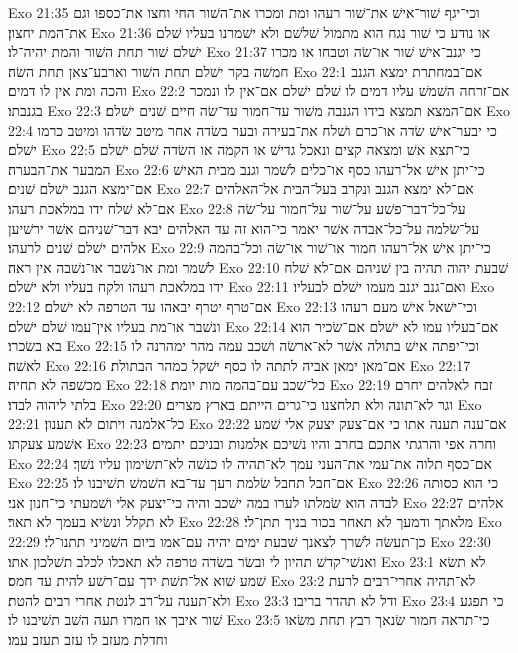 Exo 21:35  וכי־יגף שׁור־אישׁ את־שׁור רעהו ומת ומכרו את־השׁור החי וחצו את־כספו וגם את־המת יחצון׃
Exo 21:36  או נודע כי שׁור נגח הוא מתמול שׁלשׁם ולא ישׁמרנו בעליו שׁלם ישׁלם שׁור תחת השׁור והמת יהיה־לו׃
Exo 21:37  כי יגנב־אישׁ שׁור או־שׂה וטבחו או מכרו חמשׁה בקר ישׁלם תחת השׁור וארבע־צאן תחת השׂה׃
Exo 22:1  אם־במחתרת ימצא הגנב והכה ומת אין לו דמים׃
Exo 22:2  אם־זרחה השׁמשׁ עליו דמים לו שׁלם ישׁלם אם־אין לו ונמכר בגנבתו׃
Exo 22:3  אם־המצא תמצא בידו הגנבה משׁור עד־חמור עד־שׂה חיים שׁנים ישׁלם׃
Exo 22:4  כי יבער־אישׁ שׂדה או־כרם ושׁלח את־בעירה ובער בשׂדה אחר מיטב שׂדהו ומיטב כרמו ישׁלם׃
Exo 22:5  כי־תצא אשׁ ומצאה קצים ונאכל גדישׁ או הקמה או השׂדה שׁלם ישׁלם המבער את־הבערה׃
Exo 22:6  כי־יתן אישׁ אל־רעהו כסף או־כלים לשׁמר וגנב מבית האישׁ אם־ימצא הגנב ישׁלם שׁנים׃
Exo 22:7  אם־לא ימצא הגנב ונקרב בעל־הבית אל־האלהים אם־לא שׁלח ידו במלאכת רעהו׃
Exo 22:8  על־כל־דבר־פשׁע על־שׁור על־חמור על־שׂה על־שׂלמה על־כל־אבדה אשׁר יאמר כי־הוא זה עד האלהים יבא דבר־שׁניהם אשׁר ירשׁיען אלהים ישׁלם שׁנים לרעהו׃
Exo 22:9  כי־יתן אישׁ אל־רעהו חמור או־שׁור או־שׂה וכל־בהמה לשׁמר ומת או־נשׁבר או־נשׁבה אין ראה׃
Exo 22:10  שׁבעת יהוה תהיה בין שׁניהם אם־לא שׁלח ידו במלאכת רעהו ולקח בעליו ולא ישׁלם׃
Exo 22:11  ואם־גנב יגנב מעמו ישׁלם לבעליו׃
Exo 22:12  אם־טרף יטרף יבאהו עד הטרפה לא ישׁלם׃
Exo 22:13  וכי־ישׁאל אישׁ מעם רעהו ונשׁבר או־מת בעליו אין־עמו שׁלם ישׁלם׃
Exo 22:14  אם־בעליו עמו לא ישׁלם אם־שׂכיר הוא בא בשׂכרו׃
Exo 22:15  וכי־יפתה אישׁ בתולה אשׁר לא־ארשׂה ושׁכב עמה מהר ימהרנה לו לאשׁה׃
Exo 22:16  אם־מאן ימאן אביה לתתה לו כסף ישׁקל כמהר הבתולת׃
Exo 22:17  מכשׁפה לא תחיה׃
Exo 22:18  כל־שׁכב עם־בהמה מות יומת׃
Exo 22:19  זבח לאלהים יחרם בלתי ליהוה לבדו׃
Exo 22:20  וגר לא־תונה ולא תלחצנו כי־גרים הייתם בארץ מצרים׃
Exo 22:21  כל־אלמנה ויתום לא תענון׃
Exo 22:22  אם־ענה תענה אתו כי אם־צעק יצעק אלי שׁמע אשׁמע צעקתו׃
Exo 22:23  וחרה אפי והרגתי אתכם בחרב והיו נשׁיכם אלמנות ובניכם יתמים׃
Exo 22:24  אם־כסף תלוה את־עמי את־העני עמך לא־תהיה לו כנשׁה לא־תשׂימון עליו נשׁך׃
Exo 22:25  אם־חבל תחבל שׂלמת רעך עד־בא השׁמשׁ תשׁיבנו לו׃
Exo 22:26  כי הוא כסותה לבדה הוא שׂמלתו לערו במה ישׁכב והיה כי־יצעק אלי ושׁמעתי כי־חנון אני׃
Exo 22:27  אלהים לא תקלל ונשׂיא בעמך לא תאר׃
Exo 22:28  מלאתך ודמעך לא תאחר בכור בניך תתן־לי׃
Exo 22:29  כן־תעשׂה לשׁרך לצאנך שׁבעת ימים יהיה עם־אמו ביום השׁמיני תתנו־לי׃
Exo 22:30  ואנשׁי־קדשׁ תהיון לי ובשׂר בשׂדה טרפה לא תאכלו לכלב תשׁלכון אתו׃
Exo 23:1  לא תשׂא שׁמע שׁוא אל־תשׁת ידך עם־רשׁע להית עד חמס׃
Exo 23:2  לא־תהיה אחרי־רבים לרעת ולא־תענה על־רב לנטת אחרי רבים להטת׃
Exo 23:3  ודל לא תהדר בריבו׃
Exo 23:4  כי תפגע שׁור איבך או חמרו תעה השׁב תשׁיבנו לו׃
Exo 23:5  כי־תראה חמור שׂנאך רבץ תחת משׂאו וחדלת מעזב לו עזב תעזב עמו׃
